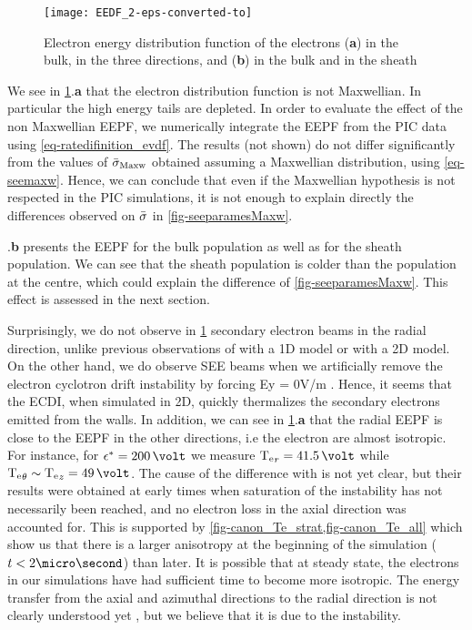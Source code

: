      \begin{figure}[hbtp]
       \centering
       \texttt{[image: EEDF\_2-eps-converted-to]}
       \caption{Electron energy distribution function of the electrons ({\bf a}) in the bulk, in the three directions, and ({\bf b}) in the bulk and in the sheath}
       \label{fig-EEDF}
     \end{figure}
     
    We see in \cref{fig-EEDF}.{\bf a} that the electron distribution function is not Maxwellian.
    In particular the high energy tails are depleted.
    In order to evaluate the effect of the non Maxwellian EEPF, we numerically integrate the EEPF from the PIC data using \cref{eq-ratedifinition_evdf}.
    The results (not shown) do not differ significantly from the values of $ \bar{\sigma }_{\rm Maxw}$ obtained assuming a Maxwellian distribution, using \cref{eq-seemaxw}.
    Hence, we can conclude that even if the Maxwellian hypothesis is not respected in the PIC simulations, it is not enough to explain directly the differences observed on $ \bar{\sigma }$ in \cref{fig-seeparamesMaxw}.


    .{\bf b} presents the EEPF for the bulk population as well as for the sheath population.
    We can see that the sheath population is colder than the population at the centre, which could explain the difference of \cref{fig-seeparamesMaxw}. 
    This effect is assessed in the next section.

     Surprisingly, we do not observe in \cref{fig-EEDF} secondary electron beams in the radial  direction, unlike previous observations of \citet{sydorenko2006} with a 1D model or \citet{heron2013} with a 2D model.
     On the other hand, we do observe SEE beams when  we artificially remove the electron cyclotron drift instability by forcing Ey = 0V/m \citep{croes2017}.
     Hence, it seems that the ECDI, when simulated in 2D, quickly thermalizes the secondary electrons emitted from the walls.
     In addition, we can see in \cref{fig-EEDF}.{\bf a} that the radial EEPF is close to the EEPF in the other directions, i.e the electron are almost isotropic.
     For instance, for $\crover = 200\,\volt$  we measure $\Te_r = 41.5\,\volt$ while $\Te_{\theta} \sim \Te_z = 49\,\volt$.
     The cause of the difference with \citet{heron2013} is not yet clear, but their results were  obtained at early times when saturation of the instability has not necessarily been reached, and no electron loss in  the axial direction was accounted for.
     This is supported by \cref{fig-canon_Te_strat,fig-canon_Te_all} which show us that there is a larger anisotropy at the beginning of the simulation ($t<2\micro\second$) than later.
     It is possible that at steady state, the electrons in our simulations have had sufficient time to become more isotropic.
     The energy transfer from the axial and azimuthal directions to the radial direction is not clearly understood
     yet \citep{janhunen2018}, but we believe that it is due to the instability.



